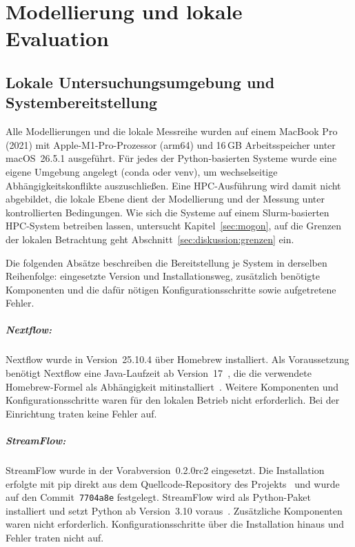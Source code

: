 
\lstset{breaklines=true, breakatwhitespace=false}

\chapter{Modellierung und lokale Evaluation}
\label{sec:lokal}

\section{Lokale Untersuchungsumgebung und Systembereitstellung}
\label{sec:lokal:umgebung}

Alle Modellierungen und die lokale Messreihe wurden auf einem MacBook
Pro (2021) mit Apple-M1-Pro-Prozessor (arm64) und 16\,GB
Arbeitsspeicher unter macOS~26.5.1 ausgeführt. Für jedes der
Python-basierten Systeme wurde eine eigene Umgebung angelegt (conda
oder venv), um wechselseitige Abhängigkeitskonflikte auszuschließen. Eine HPC-Ausführung wird damit nicht abgebildet, die lokale Ebene
dient der Modellierung und der Messung unter kontrollierten
Bedingungen. Wie sich die
Systeme auf einem Slurm-basierten HPC-System betreiben lassen,
untersucht Kapitel~\ref{sec:mogon}, auf die Grenzen der lokalen
Betrachtung geht Abschnitt~\ref{sec:diskussion:grenzen} ein.

Die folgenden Absätze beschreiben die Bereitstellung je System in
derselben Reihenfolge: eingesetzte Version und Installationsweg,
zusätzlich benötigte Komponenten und die dafür nötigen
Konfigurationsschritte sowie aufgetretene Fehler.

\paragraph{Nextflow:} Nextflow wurde in Version~25.10.4 über Homebrew
installiert. Als Voraussetzung benötigt Nextflow eine Java-Laufzeit
ab Version~17~\cite{nextflowdocs-install}, die die verwendete
Homebrew-Formel als Abhängigkeit mitinstalliert~\cite{brewnextflow}.
Weitere Komponenten und Konfigurationsschritte waren für den lokalen
Betrieb nicht erforderlich. Bei der Einrichtung traten keine Fehler
auf.

\paragraph{StreamFlow:} StreamFlow wurde in der Vorabversion~0.2.0rc2
eingesetzt. Die Installation erfolgte mit pip direkt aus dem
Quellcode-Repository des Projekts~\cite{streamflowrepo} und wurde auf
den Commit~\texttt{7704a8e} festgelegt. StreamFlow wird als
Python-Paket installiert und setzt Python ab Version~3.10
voraus~\cite{streamflowdocs}. Zusätzliche Komponenten waren nicht
erforderlich. Konfigurationsschritte über die
Installation hinaus und Fehler traten nicht auf.

